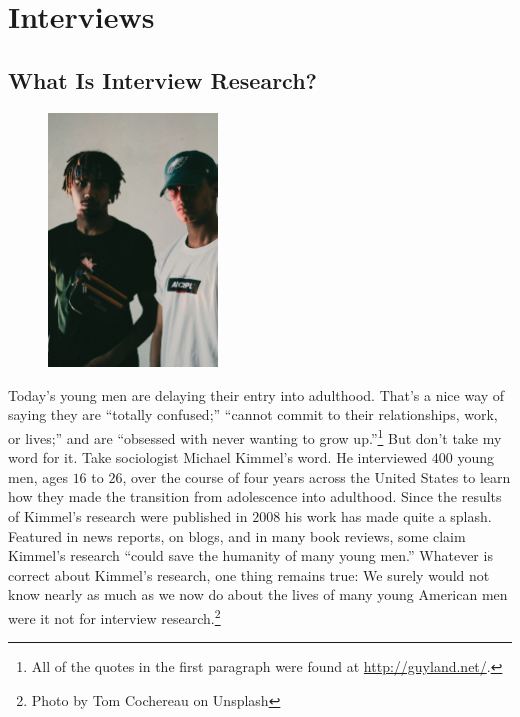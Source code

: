 \chapter{Interviews}\label{ch10:interviews}

\section{What Is Interview Research?}

\begin{figure}
	\centering
	\includegraphics[width=0.4\textwidth]{gfx/09-men} 
\end{figure}

Today's young men are delaying their entry into adulthood. That's a nice way of saying they are ``totally confused;'' ``cannot commit to their relationships, work, or lives;'' and are ``obsessed with never wanting to grow up.''\footnote{All of the quotes in the first paragraph were found at \url{http://guyland.net/}.} But don't take my word for it. Take sociologist Michael Kimmel's word. He interviewed $ 400 $ young men, ages $ 16 $ to $ 26 $, over the course of four years across the United States to learn how they made the transition from adolescence into adulthood. Since the results of Kimmel's research were published in $ 2008 $ \cite{kimmel2008perilous} his work has made quite a splash. Featured in news reports, on blogs, and in many book reviews, some claim Kimmel's research ``could save the humanity of many young men.'' Whatever is correct about Kimmel's research, one thing remains true: We surely would not know nearly as much as we now do about the lives of many young American men were it not for interview research.\footnote{Photo by Tom Cochereau on Unsplash}

